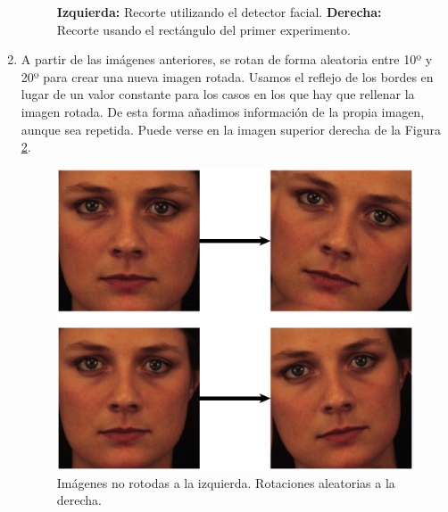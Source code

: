 \documentclass[a4paper,11pt]{book}
\begin{document}
\begin{enumerate}
\begin{figure}[h]
			\caption[Experimento 2 Rectangulo vs Detector]{\textbf{Izquierda:} Recorte utilizando el detector facial. \textbf{Derecha:} Recorte usando el rectángulo del primer experimento.}
			\label{fig:segundoIntentoDA2}
		\end{figure}
	\item A partir de las imágenes anteriores, se rotan de forma aleatoria entre 10º y 20º para crear una nueva imagen rotada. Usamos el reflejo de los bordes en lugar de un valor constante para los casos en los que hay que rellenar la imagen rotada. De esta forma añadimos información de la propia imagen, aunque sea repetida. Puede verse en la imagen superior derecha de la Figura \ref{fig:segundoIntentoDA3}.
		\begin{figure}[h]
			\centering
			\includegraphics[width=0.7\linewidth]{imagenes/segundoIntentoDA3}
			\caption[Experimento 2 Rotaciones]{ Imágenes no rotodas a la izquierda. Rotaciones aleatorias a la derecha.}
			\label{fig:segundoIntentoDA3}
		\end{figure}
	

\end{enumerate}
\end{document}
